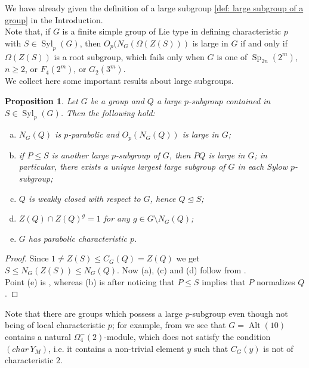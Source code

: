 \documentclass{amsart}
\numberwithin{equation}{section}
\newtheorem{prop}[equation]{Proposition}
\theoremstyle{definition}
\theoremstyle{subresult}
\theoremstyle{caseresult}
\newcommand{\Syl}{\operatorname{Syl}}
\newcommand{\Sp}{\operatorname{Sp}}
\newcommand{\Alt}{\operatorname{Alt}}
\newcommand{\norm}{\trianglelefteq}
\newcommand{\<}{\langle}
\renewcommand{\>}{\rangle}
\begin{document}
\vspace{0.4cm}
We have already given the definition of a large subgroup \ref{def: large subgroup of a group} in the Introduction.\\
Note that, if $G$ is a finite simple group of Lie type in defining characteristic $p$ with $S \in \Syl_p(G)$, then $O_p(N_G(\Omega(Z(S)))$ is large in $G$ if and only if $\Omega(Z(S))$ is a root subgroup, which fails only when $G$ is one of $\Sp_{2n}(2^m)$, $n \ge 2$, or $F_4(2^m)$, or $G_2(3^m)$.\\

We collect here some important results about large subgroups.

\begin{prop}\label{prop:properties of large in a group}
    Let $G$ be a group and $Q$ a large $p$-subgroup contained in $S \in \Syl_p(G)$. Then the following hold:
    \begin{enumerate}[(a)]
        \item $N_G(Q)$ is $p$-parabolic and $O_p(N_G(Q))$ is large in $G$;
        \item if $P \le S$ is another large $p$-subgroup of $G$, then $PQ$ is large in $G$; in particular, there exists a unique largest large subgroup of $G$ in each Sylow $p$-subgroup;
        \item $Q$ is weakly closed with respect to $G$, hence $Q \norm S$;
        \item $Z(Q) \cap Z(Q)^g = 1$ for any $g \in G \setminus N_G(Q)$;
        \item $G$ has parabolic characteristic $p$.
    \end{enumerate}
\end{prop}
\begin{proof}
    Since $1 \ne Z(S) \le C_G(Q)=Z(Q)$ we get $S \le N_G(Z(S)) \le N_G(Q)$. Now (a), (c) and (d) follow from \cite[Lemma 1.52(b) and (e)]{Meier-Stell-Stroth:2012}.\\
    Point (e) is \cite[Lemma 1.55]{Meier-Stell-Stroth:2012}, whereas (b) is \cite[Lemma 4.2(c)]{Henke-Salati:2026} after noticing that $P \le S$ implies that $P$ normalizes $Q$.
\end{proof}

Note that there are groups which possess a large $p$-subgroup even though not being of local characteristic $p$; for example, from \cite[Table 1 in Chapter 7]{Meier-Stell-Stroth:2012} we see that $G=\Alt(10)$ contains a natural $\Omega_4^-(2)$-module, which does not satisfy the condition $(char \, Y_M)$, i.e. it contains a non-trivial element $y$ such that $C_G(y)$ is not of characteristic $2$.
\end{document}
